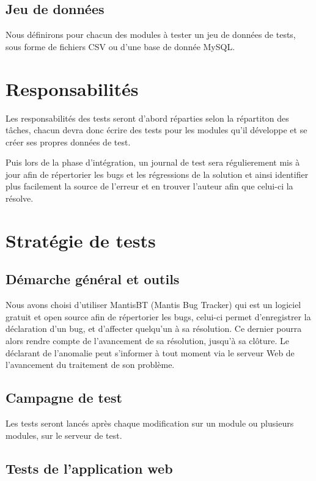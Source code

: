 \section{Jeu de données}
Nous définirons pour chacun des modules à tester un jeu de données de tests, sous forme de fichiers
CSV ou d'une base de donnée MySQL.
 
\chapter{Responsabilités}
Les responsabilités des tests seront d'abord réparties selon la répartiton des tâches, chacun
devra donc écrire des tests pour les modules qu'il développe et se créer ses propres données
de test.

Puis lors de la phase d'intégration, un journal de test sera régulierement mis à jour
afin de répertorier les bugs et les régressions de la solution et ainsi identifier plus      
facilement la source de l'erreur et en trouver l'auteur afin que celui-ci la résolve.


\chapter{Stratégie de tests}

\section{Démarche général et outils}
\label{section:dem_gen}
Nous avons choisi d'utiliser MantisBT (Mantis Bug Tracker) qui est un logiciel gratuit
et open source afin de répertorier les bugs, celui-ci permet d'enregistrer la déclaration
 d'un bug, et d'affecter quelqu'un à sa résolution. Ce dernier pourra alors rendre compte de
l'avancement de sa résolution, jusqu'à sa clôture. Le déclarant de l'anomalie peut  
s'informer à tout moment via le serveur Web de l'avancement du traitement de 
son problème.  

\section{Campagne de test}
Les tests seront lancés après chaque modification sur un module ou plusieurs modules, sur
le serveur de test.

\section{Tests de l'application web}

